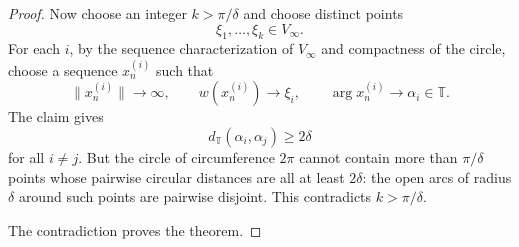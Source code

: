 \documentclass[10pt,a4paper]{amsart}
\begin{document}
\begin{proof}
Now choose an integer $k>\pi/\delta$ and choose distinct points
\[
\xi_1,\ldots,\xi_k\in V_\infty .
\]
For each $i$, by the sequence characterization of $V_\infty$ and compactness of the circle, choose a sequence $x_n^{(i)}$ such that
\[
\|x_n^{(i)}\|\to\infty,
\qquad
w(x_n^{(i)})\to\xi_i,
\qquad
\arg x_n^{(i)}\to\alpha_i\in\mathbb T .
\]
The claim gives
\[
d_{\mathbb T}(\alpha_i,\alpha_j)\ge 2\delta
\]
for all $i\ne j$. But the circle of circumference $2\pi$ cannot contain more than $\pi/\delta$ points whose pairwise circular distances are all at least $2\delta$: the open arcs of radius $\delta$ around such points are pairwise disjoint. This contradicts $k>\pi/\delta$.

The contradiction proves the theorem.
\end{proof}
\end{document}
